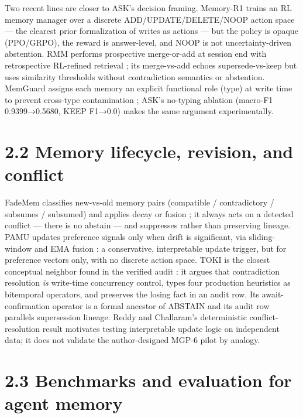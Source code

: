 Two recent lines are closer to ASK's decision framing. Memory-R1 trains
an RL memory manager over a discrete ADD/UPDATE/DELETE/NOOP action space
\citep{yan2025memoryr1} --- the clearest prior formalization of writes
as actions --- but the policy is opaque (PPO/GRPO), the reward is
answer-level, and NOOP is not uncertainty-driven abstention. RMM
performs prospective merge-or-add at session end with retrospective
RL-refined retrieval \citep{tan2025rmm}; its merge-vs-add echoes
supersede-vs-keep but uses similarity thresholds without contradiction
semantics or abstention. MemGuard assigns each memory an explicit
functional role (type) at write time to prevent cross-type contamination
\citep{ha2026memguard}; ASK's no-typing ablation (macro-F1
0.9399→0.5680, KEEP F1→0.0) makes the same argument experimentally.

\section{2.2 Memory lifecycle, revision, and
conflict}\label{memory-lifecycle-revision-and-conflict}

FadeMem classifies new-vs-old memory pairs (compatible / contradictory /
subsumes / subsumed) and applies decay or fusion \citep{fademem2026}; it
always acts on a detected conflict --- there is no abstain --- and
suppresses rather than preserving lineage. PAMU updates preference
signals only when drift is significant, via sliding-window and EMA
fusion \citep{sun2025pamu}: a conservative, interpretable update
trigger, but for preference vectors only, with no discrete action space.
TOKI is the closest conceptual neighbor found in the verified audit
\citep{wang2026toki}: it argues that contradiction resolution \emph{is}
write-time concurrency control, types four production heuristics as
bitemporal operators, and preserves the losing fact in an audit row. Its
await-confirmation operator is a formal ancestor of ABSTAIN and its
audit row parallels supersession lineage. Reddy and Challaram's
deterministic conflict-resolution result \citep{reddy2026freshness}
motivates testing interpretable update logic on independent data; it
does not validate the author-designed MGP-6 pilot by analogy.

\section{2.3 Benchmarks and evaluation for agent
memory}\label{benchmarks-and-evaluation-for-agent-memory}

